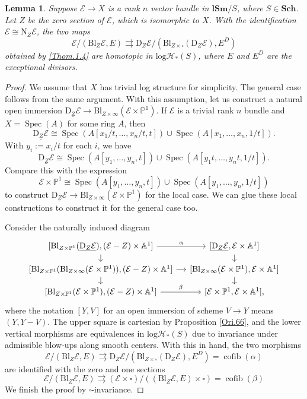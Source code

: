 \documentclass[11pt, a4paper]{amsart}
\newtheorem{lem}[thm]{Lemma}
\theoremstyle{definition}
\numberwithin{equation}{subsection}
\renewcommand{\P}{\mathbb{P}}
\newcommand{\A}{\mathbb{A}}
\newcommand{\Sch}{\mathbf{Sch}}
\newcommand{\lSm}{\mathbf{lSm}}
\providecommand{\Spec}[1]{\operatorname{Spec}(#1)} 	%
\newcommand{\Blow}{{\mathrm{Bl}}}
\newcommand{\Normal}{{\mathrm{N}}}
\newcommand{\Deform}{{\mathrm{D}}}
\renewcommand{\ul}{\underline}
\newcommand{\cE}{\mathcal{E}}
\newcommand{\boxx}{\square}
\newcommand{\cofib}{\operatorname{cofib}}
\newcommand{\inflogHpt}{\mathrm{log}\mathcal{H}_\ast}
\begin{document}
\begin{lem}
\label{Ori.36}
Suppose $\cE\to X$ is a rank $n$ vector bundle in $\lSm/S$, where $S\in \Sch$.
Let $Z$ be the zero section of $\cE$,
which is isomorphic to $X$.
With the identification $\cE\cong \Normal_Z \cE$, the two maps
\begin{equation}
\label{Ori.36.3}
\cE/(\Blow_Z \cE,E)
\rightrightarrows
\Deform_Z \cE/(\Blow_{Z\times \boxx}(\Deform_Z \cE),E^D)
\end{equation}
obtained by \eqref{Thom.1.4} are homotopic in $\inflogHpt(S)$, where $E$ and $E^D$ are the exceptional divisors.
\end{lem}
\begin{proof}
We assume that $X$ has trivial log structure for simplicity.
The general case follows from the same argument.
With this assumption,
let us construct a natural open immersion $\ul{\Deform_Z \cE}\to \Blow_{Z\times \infty}(\cE\times \P^1)$.
If $\cE$ is a trivial rank $n$ bundle and $X=\Spec{A}$ for some ring $A$,
then
\[
\ul{\Deform_Z \cE}
\cong
\Spec{A[x_1/t,\ldots,x_n/t,t]}
\cup
\Spec{A[x_1,\ldots,x_n,1/t]}.
\]
With $y_i:=x_i/t$ for each $i$,
we have
\[
\ul{\Deform_Z \cE}
\cong
\Spec{A[y_1,\ldots,y_n,t]}
\cup
\Spec{A[y_1t,\ldots,y_nt,1/t]}.
\]
Compare this with the expression
\[
\cE\times \P^1
\cong
\Spec{A[y_1,\ldots,y_n,t]}\cup \Spec{A[y_1,\ldots,y_n,1/t]}
\]
to construct $\ul{\Deform_Z \cE}\to \Blow_{Z\times \infty}(\cE\times \P^1)$ for the local case. We can glue these local constructions to construct it for the general case too.

Consider the naturally induced diagram
\begin{equation*}
\begin{tikzcd}[column sep=small, row sep=small]
{[\Blow_{Z\times \P^1}(\ul{\Deform_{Z}\cE}),(\cE-Z)\times \A^1]}\ar[d]\ar[r,"\alpha"]
&
{[\ul{\Deform_{Z}\cE},\cE\times \A^1]}\ar[d]
\\
{[\Blow_{Z\times \P^1}(\Blow_{Z\times \infty}(\cE\times \P^1)),(\cE-Z)\times \A^1]}\ar[d]\ar[r]
&
{[\Blow_{Z\times \infty}(\cE\times \P^1),\cE\times \A^1]}\ar[d]
\\
{[\Blow_{Z\times \P^1}(\cE\times \P^1),(\cE-Z)\times \A^1]}\ar[r,"\beta"]
&
{[\cE\times \P^1,\cE\times \A^1]},
\end{tikzcd}
\end{equation*}
where the notation $[Y,V]$ for an open immersion of scheme $V\to Y$ means $(Y,Y-V)$.
The upper square is cartesian by Proposition \ref{Ori.66},
and the lower vertical morphisms are equivalences in $\inflogHpt(S)$ due to invariance under admissible blow-ups along smooth centers.
With this in hand,
the two morphisms
\begin{equation}
\label{Ori.36.6}
\cE/(\Blow_Z \cE,E)
\rightrightarrows
\Deform_Z \cE/(\Blow_{Z\times \boxx}(\Deform_Z \cE),E^D)
=
\cofib(\alpha)
\end{equation}
are identified with the zero and one sections
\begin{equation}
\label{Ori.36.7}
\cE/(\Blow_Z \cE,E)
\rightrightarrows
(\cE\times \square)/((\Blow_Z \cE,E)\times \square)=\cofib(\beta)
\end{equation}
We finish the proof by $\square$-invariance.
\end{proof}
\end{document}
